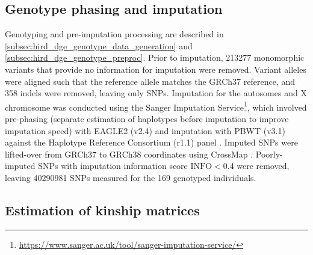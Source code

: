 \subsection{Genotype phasing and imputation}
\label{subsec:hird_reQTL_methods_genotypePhasingAndImputation}

Genotyping and pre-imputation processing are described in \cref{subsec:hird_dge_genotype_data_generation} and \cref{subsec:hird_dge_genotype_preproc}.
Prior to imputation, \num{213277} monomorphic variants that provide no information for imputation were removed.
Variant alleles were aligned such that the reference allele matches the GRCh37 reference, and 358 indels were removed, leaving only \glspl{SNP}.
Imputation for the autosomes and X chromosome was conducted using the Sanger Imputation Service\footnote{\url{https://www.sanger.ac.uk/tool/sanger-imputation-service/}}, 
which involved pre-phasing (separate estimation of haplotypes before imputation to improve imputation speed) with EAGLE2 \autocite{loh2016ReferencebasedPhasingUsinga} (v2.4) 
and imputation with PBWT \autocite{durbin2014EfficientHaplotypeMatching} (v3.1) 
against the Haplotype Reference Consortium (r1.1) panel \autocite{mccarthy2016ReferencePanel64}.
Imputed \glspl{SNP} were lifted-over from GRCh37 to GRCh38 coordinates using CrossMap \autocite{zhao2014CrossMapVersatileTool}.
Poorly-imputed \glspl{SNP} with imputation information score $\text{INFO} < 0.4$
were removed, leaving \num{40290981} \glspl{SNP} measured for the 169 genotyped individuals.

\subsection{Estimation of kinship matrices}
\label{subsec:hird_reQTL_LDAK}

